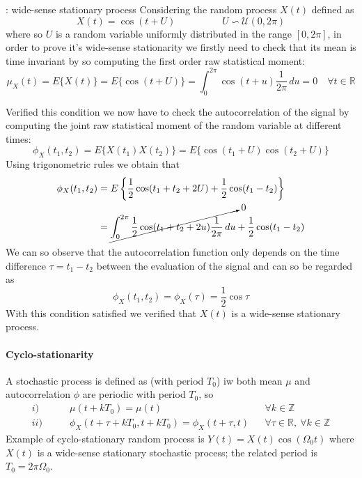 		
		\begin{example}{: wide-sense stationary process}
			Considering the random process $X(t)$ defined as
			\[ X(t) = \cos(t + U) \hspace{2cm} U \backsim \mathcal U(0,2\pi) \]
			where so $U$ is a random variable uniformly distributed in the range $[0,2\pi]$, in order to prove it's wide-sense stationarity we firstly need to check that its mean is time invariant by so computing the first order raw statistical moment:
			\[ \mu_X(t) = E\{X(t)\} = E\{ \cos(t + U) \} = \int_0^{2\pi} \cos(t+u) \frac 1 {2\pi}\, du = 0 \quad \forall t\in \mathds R \]
			
			Verified this condition we now have to check the autocorrelation of the signal by computing the joint raw statistical moment of the random variable at different times:
			\[\phi_X(t_1,t_2) = E\{ X(t_1) X(t_2) \} = E\{ \cos(t_1 + U) \cos(t_2 + U) \} \]
			Using trigonometric rules we obtain that
			\begin{align*}
				\phi_X(t_1,t_2) & = E\left\{ \frac 1 2 \cos(t_1+t_2+2U) + \frac 1 2 \cos(t_1-t_2) \right\} \\
				& = \cancelto{0}{\int_0^{2\pi} \frac 1 2 \cos(t_1 + t_2 + 2u)\frac 1{2\pi}\, du} + \frac 1 2 \cos(t_1-t_2)
			\end{align*}
			We can so observe that the autocorrelation function only depends on the time difference $\tau = t_1-t_2$ between the evaluation of the signal and can so be regarded as
			\[ \phi_X(t_1,t_2) = \phi_X(\tau) = \frac 1 2 \cos \tau \]
			With this condition satisfied we verified that $X(t)$ is a wide-sense stationary process.			
		\end{example}
		
		\paragraph{Cyclo-stationarity} A stochastic process is defined as  (with period $T_0$) iw both mean $\mu$ and autocorrelation $\phi$ are periodic with period $T_0$, so
		\begin{align*}
			i) \qquad & \mu(t+ kT_0) = \mu(t) && \forall k\in\mathds Z \\
			ii) \qquad & \phi_X(t+\tau+kT_0, t+kT_0) = \phi_X(t+\tau,t) && \forall \tau \in \mathds R , \ \forall k\in \mathds Z
		\end{align*}
		Example of cyclo-stationary random process is $Y(t) = X(t) \cos(\Omega_0 t)$ where $X(t)$ is a wide-sense stationary stochastic process; the related period is $T_0 = 2\pi \Omega_0$.
		
